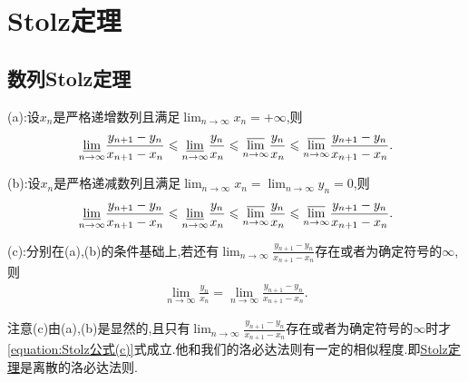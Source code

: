\documentclass[../../main.tex]{subfiles}
\begin{document}
\section{Stolz定理}

\subsection{数列Stolz定理}

\begin{theorem}[Stolz定理]\label{theorem:Stolz定理}
(a):设\(x_n\)是严格递增数列且满足\(\lim_{n \to \infty} x_n = +\infty\),则
\begin{align*}
\underset{n\rightarrow \infty}{{\varliminf }} \frac{y_{n + 1} - y_n}{x_{n + 1} - x_n} \leqslant \underset{n\rightarrow \infty}{{\varliminf }} \frac{y_n}{x_n} \leqslant \underset{n\rightarrow \infty}{{\varlimsup }} \frac{y_n}{x_n} \leqslant \underset{n\rightarrow \infty}{{\varlimsup }} \frac{y_{n + 1} - y_n}{x_{n + 1} - x_n}.
\end{align*}

(b):设\(x_n\)是严格递减数列且满足\(\lim_{n \to \infty} x_n = \lim_{n \to \infty} y_n = 0\),则
\begin{align*}
\underset{n\rightarrow \infty}{{\varliminf }} \frac{y_{n + 1} - y_n}{x_{n + 1} - x_n} \leqslant \underset{n\rightarrow \infty}{{\varliminf }} \frac{y_n}{x_n} \leqslant \underset{n\rightarrow \infty}{{\varlimsup }} \frac{y_n}{x_n} \leqslant \underset{n\rightarrow \infty}{{\varlimsup }} \frac{y_{n + 1} - y_n}{x_{n + 1} - x_n}.
\end{align*}

(c):分别在(a),(b)的条件基础上,若还有\(\lim_{n \to \infty} \frac{y_{n + 1} - y_n}{x_{n + 1} - x_n}\)存在或者为确定符号的\(\infty\),则
\begin{align}\label{equation:Stolz公式(c)}
\lim_{n \to \infty} \frac{y_n}{x_n} = \lim_{n \to \infty} \frac{y_{n + 1} - y_n}{x_{n + 1} - x_n} .
\end{align}
\end{theorem}
\begin{remark}
注意(c)由(a),(b)是显然的,且只有\(\lim_{n \to \infty} \frac{y_{n + 1} - y_n}{x_{n + 1} - x_n}\)存在或者为确定符号的\(\infty\)时才\eqref{equation:Stolz公式(c)}式成立.他和我们的洛必达法则有一定的相似程度.即\hyperref[theorem:Stolz定理]{Stolz定理}是离散的洛必达法则.
\end{remark}
\end{document}
